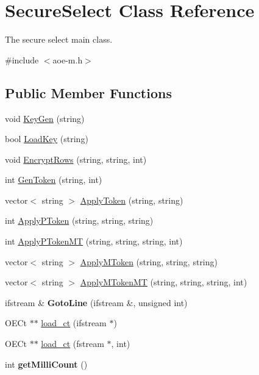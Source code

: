 \hypertarget{classSecureSelect}{\section{Secure\-Select Class Reference}
\label{classSecureSelect}
}


The secure select main class.  




{\ttfamily \#include $<$aoe-\/m.\-h$>$}

\subsection*{Public Member Functions}
\begin{DoxyCompactItemize}
\item 
void \hyperlink{classSecureSelect_a72c8b1ac19619a6eeaa722f766e53b3f}{Key\-Gen} (string)
\item 
bool \hyperlink{classSecureSelect_ad7a2125393de550771e4e9177a1552b3}{Load\-Key} (string)
\item 
void \hyperlink{classSecureSelect_ada64a34744ec0598327f8e926c7fa2d6}{Encrypt\-Rows} (string, string, int)
\item 
int \hyperlink{classSecureSelect_a88e8f870930dfbeae24d355412b1d0a3}{Gen\-Token} (string, int)
\item 
vector$<$ string $>$ \hyperlink{classSecureSelect_a55312fbd535adba75ba328d060faff35}{Apply\-Token} (string, string)
\item 
int \hyperlink{classSecureSelect_aab33712ef6fbbe6922a2d8156b88dc27}{Apply\-P\-Token} (string, string, string)
\item 
int \hyperlink{classSecureSelect_a1a556c61d392fa9d2dfd1eb6684bafc1}{Apply\-P\-Token\-M\-T} (string, string, string, int)
\item 
vector$<$ string $>$ \hyperlink{classSecureSelect_a4b912c3407b0664ae37d2ccfce4eafc5}{Apply\-M\-Token} (string, string, string)
\item 
vector$<$ string $>$ \hyperlink{classSecureSelect_a168537e2cf5070fe9b137239a2d6155e}{Apply\-M\-Token\-M\-T} (string, string, string, int)
\item 
\hypertarget{classSecureSelect_a177b3724ce3e8ea4695b2950546d596d}{ifstream \& {\bfseries Goto\-Line} (ifstream \&, unsigned int)}\label{classSecureSelect_a177b3724ce3e8ea4695b2950546d596d}

\item 
O\-E\-Ct $\ast$$\ast$ \hyperlink{classSecureSelect_a2163cc84d91843d5ba52876cf75d9d83}{load\-\_\-ct} (ifstream $\ast$)
\item 
O\-E\-Ct $\ast$$\ast$ \hyperlink{classSecureSelect_affb3955cbfae50ba7bac4c487aef0113}{load\-\_\-ct} (fstream $\ast$, int)
\item 
\hypertarget{classSecureSelect_a772ad7704ae82ada1dfbbafdde5def20}{int {\bfseries get\-Milli\-Count} ()}\label{classSecureSelect_a772ad7704ae82ada1dfbbafdde5def20}


\end{DoxyCompactItemize}
